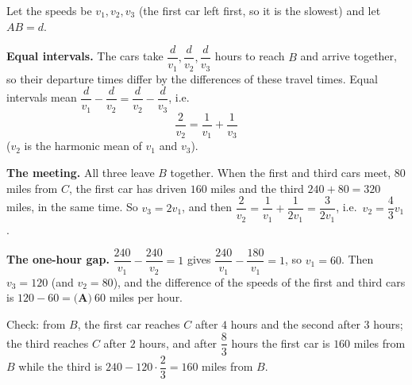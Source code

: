 Let the speeds be $v_1,v_2,v_3$ (the first car left first, so it is the slowest) and let $AB=d$.

\textbf{Equal intervals.} The cars take $\dfrac{d}{v_1},\dfrac{d}{v_2},\dfrac{d}{v_3}$ hours to reach $B$ and arrive together, so their departure times differ by the differences of these travel times. Equal intervals mean $\dfrac{d}{v_1}-\dfrac{d}{v_2}=\dfrac{d}{v_2}-\dfrac{d}{v_3}$, i.e.
\[
\dfrac{2}{v_2}=\dfrac{1}{v_1}+\dfrac{1}{v_3}
\]
($v_2$ is the harmonic mean of $v_1$ and $v_3$).

\textbf{The meeting.} All three leave $B$ together. When the first and third cars meet, $80$ miles from $C$, the first car has driven $160$ miles and the third $240+80=320$ miles, in the same time. So $v_3=2v_1$, and then $\dfrac{2}{v_2}=\dfrac{1}{v_1}+\dfrac{1}{2v_1}=\dfrac{3}{2v_1}$, i.e.\ $v_2=\dfrac{4}{3}v_1$.

\textbf{The one-hour gap.} $\dfrac{240}{v_1}-\dfrac{240}{v_2}=1$ gives $\dfrac{240}{v_1}-\dfrac{180}{v_1}=1$, so $v_1=60$. Then $v_3=120$ (and $v_2=80$), and the difference of the speeds of the first and third cars is $120-60=\boxed{\textbf{(A)}\ 60}$ miles per hour.

Check: from $B$, the first car reaches $C$ after $4$ hours and the second after $3$ hours; the third reaches $C$ after $2$ hours, and after $\dfrac{8}{3}$ hours the first car is $160$ miles from $B$ while the third is $240-120\cdot\dfrac{2}{3}=160$ miles from $B$.
